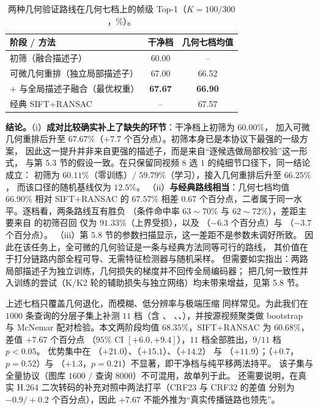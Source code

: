 \begin{table}[t]
\centering
\caption{两种几何验证路线在几何七档上的帧级 Top-1（$K=100/300$，\%）。}
\label{tab:geo}
\small
\begin{tabular}{lcc}
\toprule
阶段 / 方法 & 干净档 & 几何七档均值 \\
\midrule
初筛（融合描述子）                     & 60.00 & -- \\
可微几何重排（独立局部描述子）          & 67.00 & 66.52 \\
$+$ 与全局描述子融合（最优权重）        & \textbf{67.67} & \textbf{66.90} \\
经典 SIFT$+$RANSAC                     & -- & 67.57 \\
\bottomrule
\end{tabular}
\end{table}

\textbf{结论。}（i）\textbf{成对比较确实补上了缺失的环节}：干净档上初筛为 $60.00\%$，
加入可微几何重排后升至 $67.67\%$（$+7.7$ 个百分点）。初筛本身已是本协议下最强的一级方案，
因此这一提升并非来自更强的描述子，而是来自“逐候选做局部校验”这一形式，
与第 5.3 节的假设一致。在只保留同视频 $8$ 选 $1$ 的纯细节口径下，同一结论成立：
初筛为 $60.11\%$（零训练）$/$ $59.79\%$（学习），接入几何重排后升至 $66.25\%$，
而该口径的随机基线仅为 $12.5\%$。
（ii）\textbf{与经典路线相当}：几何七档均值 $66.90\%$ 相对 SIFT$+$RANSAC 的 $67.57\%$
相差 $0.67$ 个百分点，二者属于同一水平。逐档看，两条路线互有胜负
（条件命中率 $63\sim70\%$ 与 $62\sim72\%$），差距主要来自  的初筛召回
仅为 $91.33\%$（上界受损），以及 （$-6.3$ 个百分点）与 
（$-3.7$ 个百分点）。
（iii）第 5.8 节的参数扫描显示，这一差距不是参数未调好所致。
因此在该任务上，全可微的几何验证是一条与经典方法同等可行的路线，
其价值在于打分链路内部全程可导、无需特征检测器与随机采样。
但需要如实指出：两路局部描述子为独立训练，几何损失的梯度并不回传全局编码器；
把几何一致性并入训练的尝试（K/K2 轮的辅助损失与独立网络）均未带来增益，见第 5.8 节。

上述七档只覆盖几何退化，而模糊、低分辨率与极端压缩
同样常见。为此我们在 $1000$ 条查询的分层子集上补测 $11$ 档（含 、
、、），并按源视频聚类做 bootstrap 与 McNemar
配对检验。本文两阶段均值 $68.35\%$，SIFT$+$RANSAC 为 $60.68\%$，差值 $+7.67$ 个百分点
（$95\%$ CI $[+6.0,+9.4]$），$11$ 档全部胜出，$9/11$ 档 $p<0.05$。
优势集中在 （$+21.0$）、（$+15.1$）、（$+14.2$）
与 （$+11.9$）；（$+0.7$，$p=0.52$）与
（$+1.3$，$p=0.21$）不显著，即干净档与纯平移两法持平。
该子集与全量协议（图库 $1600$ / 查询 $8000$）不可混用，故单列于此。
还需要说明，在真实 H.264 二次转码的补充对照中两法打平（CRF23 与 CRF32 的差值
分别为 $-0.9/+0.2$ 个百分点），因此 $+7.67$ 不能外推为“真实传播链路也领先”。

